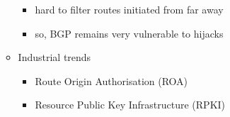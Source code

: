 \documentclass[10pt,landscape]{article}
\makeatletter
\renewcommand{\subsection}{\@startsection{subsection}{2}{0mm}%
                                {-1explus -.5ex minus -.2ex}%
                                {0.5ex plus .2ex}%
                                {\normalfont\normalsize\bfseries}}
\renewcommand{\subsubsection}{\@startsection{subsubsection}{3}{0mm}%
                                {-1ex plus -.5ex minus -.2ex}%
                                {1ex plus .2ex}%
                                {\normalfont\small\bfseries}}
\newcommand{\subsubsubsection}{\@startsection{subsubsection}{3}{0mm}%
                                {-1ex plus -.5ex minus -.2ex}%
                                {1ex plus .2ex}%
                                {\normalfont\scriptsize\bfseries}}
\makeatother
\begin{document}
\begin{multicols*}{3}
\begin{itemize}[topsep=0pt,noitemsep,wide=0pt, leftmargin=\dimexpr{} + 2\relax]
\begin{itemize}[topsep=0pt,noitemsep,wide=0pt, leftmargin=\dimexpr{} + 2\relax]
\begin{itemize}[topsep=0pt,noitemsep,wide=0pt, leftmargin=\dimexpr{} + 2\relax]
      \item hard to filter routes initiated from far away
      \item so, BGP remains very vulnerable to hijacks
    \end{itemize}
    \item Industrial trends
    \begin{itemize}[topsep=0pt,noitemsep,wide=0pt, leftmargin=\dimexpr{} + 2\relax]
      \item Route Origin Authorisation (ROA)
      \item Resource Public Key Infrastructure (RPKI)
    \end{itemize}
  \end{itemize}
\end{itemize}




\end{multicols*}
\end{document}
